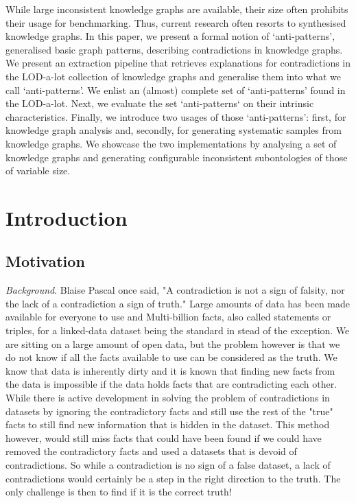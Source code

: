 \documentclass[11pt,letterpaper ,oneside ]{book}
\begin{document}
While large inconsistent knowledge graphs are available, their size often prohibits their usage for benchmarking. Thus, current research often resorts to synthesised knowledge graphs. In this paper, we present a formal notion of `anti-patterns', generalised basic graph patterns, describing contradictions in knowledge graphs. We present an extraction pipeline that retrieves explanations for contradictions in the LOD-a-lot collection of knowledge graphs and generalise them into what we call `anti-patterns'. We enlist an (almost) complete set of `anti-patterns' found in the LOD-a-lot. Next, we evaluate the set `anti-patterns` on their intrinsic characteristics. Finally, we introduce two usages of those `anti-patterns': first, for knowledge graph analysis and, secondly, for generating systematic samples from knowledge graphs. We showcase the two implementations by analysing a set of knowledge graphs and generating configurable inconsistent subontologies of those of variable size. 

\newpage
\tableofcontents
\newpage
{}

\chapter{Introduction}\label{Introduction}
\section{Motivation}
\textit{Background}. Blaise Pascal once said, "A contradiction is not a sign of falsity, nor the lack of a contradiction a sign of truth." Large amounts of data has been made available for everyone to use and Multi-billion facts, also called statements or triples, for a linked-data dataset being the standard in stead of the exception. We are sitting on a large amount of open data, but the problem however is that we do not know if all the facts available to use can be considered as the truth. We know that data is inherently dirty and it is known that finding new facts from the data is impossible if the data holds facts that are contradicting each other. While there is active development in solving the problem of contradictions in datasets by ignoring the contradictory facts and still use the rest of the "true" facts to still find new information that is hidden in the dataset. This method however, would still miss facts that could have been found if we could have removed the contradictory facts and used a datasets that is devoid of contradictions. So while a contradiction is no sign of a false dataset, a lack of contradictions would certainly be a step in the right direction to the truth. The only challenge is then to find if it is the correct truth!\\
\end{document}
